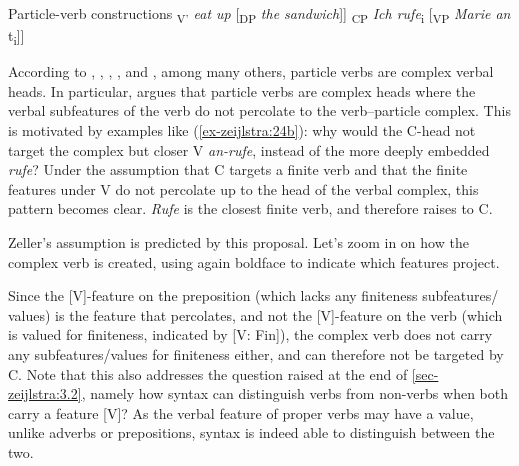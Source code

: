 \documentclass[output=paper
,modfonts
,nonflat]{langsci/langscibook}
\begin{document}
\begin{exe}
	\ex Particle-verb constructions \label{ex-zeijlstra:24}
	\xlist
	\ex {[}\textsubscript{V'} \textit{eat up} {[}\textsubscript{DP} \textit{the sandwich}{]}{]}
	\ex {[}\textsubscript{CP} \textit{Ich rufe}\textsubscript{i} \label{ex-zeijlstra:24b} {[}\textsubscript{VP} \textit{Marie an} t\textsubscript{i}{]}{]}
	\endxlist
\end{exe}
According to \citet{Riemsdijk1978}, \citet{Baker1988}, \citet{Koopman1995}, \citet{Neeleman1994, Neeleman2002}, and \citet{Zeller2001}, among many others, particle verbs are complex verbal heads. In particular, \citet{Zeller2001} argues that particle verbs are complex heads where the verbal subfeatures of the verb do not percolate to the verb–particle complex. This is motivated by examples like (\ref{ex-zeijlstra:24b}): why would the C-head not target the complex but closer V \textit{an-rufe}, instead of the more deeply embedded \textit{rufe}? Under the assumption that C targets a finite verb and that the finite features under V do not percolate up to the head of the verbal complex, this pattern becomes clear. \textit{Rufe} is the closest finite verb, and therefore raises to C.

Zeller’s assumption is predicted by this proposal. Let’s zoom in on how the complex verb is created, using again boldface to indicate which features project.

\begin{figure}[!h]
	\begin{exe}
	\end{exe} \vspace{-0.9cm}
\end{figure} 
\newpage\noindent Since the [V]-feature on the preposition (which lacks any finiteness subfeatures/ values) is the feature that percolates, and not the [V]-feature on the verb (which is valued for finiteness, indicated by [V: Fin]), the complex verb does not carry any subfeatures/values for finiteness either, and can therefore not be targeted by C. Note that this also addresses the question raised at the end of \ref{sec-zeijlstra:3.2}, namely how syntax can distinguish verbs from non-verbs when both carry a feature [V]? As the verbal feature of proper verbs may have a value, unlike adverbs or prepositions, syntax is indeed able to distinguish between the two.
\end{document}
